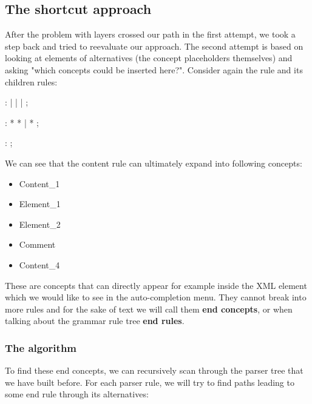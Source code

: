\subsection{The shortcut approach}

After the problem with layers crossed our path in the first attempt, we took a step back and tried to reevaluate our approach. The second attempt is based on looking at elements of alternatives (the concept placeholders themselves) and asking "which concepts could be inserted here?". Consider again the  rule and its children rules:

\begin{antlr}
	    :   
           |   
           |   
           |   
           ;
	
	    :   \literal{<}  * \literal{>} * \literal{</}  \literal{>}
           |   \literal{<}  * \literal{/>}
           ;	
	
	    :   \literal{<!--}  \literal{-->} ;
\end{antlr} 

We can see that the content rule can ultimately expand into following concepts: 

\begin{itemize}
	\setlength\itemsep{0pt}
	\item Content{\_}1
	\item Element{\_}1
	\item Element{\_}2
	\item Comment
	\item Content{\_}4
\end{itemize}

These are concepts that can directly appear for example inside the XML element which we would like to see in the auto-completion menu. They cannot break into more rules and for the sake of text we will call them \textbf{end concepts}, or when talking about the grammar rule tree \textbf{end rules}.

\subsubsection{The algorithm}
To find these end concepts, we can recursively scan through the parser tree that we have built before. For each parser rule, we will try to find paths leading to some end rule through its alternatives:

